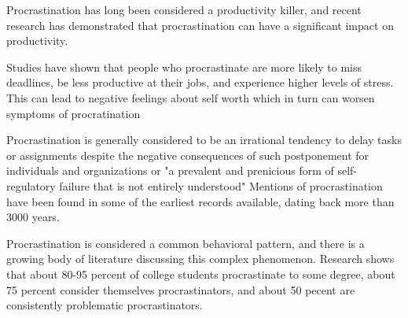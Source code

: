 

Procrastination has long been considered a productivity killer,
and recent research has demonstrated that procrastination can have a significant impact on productivity.  %

Studies have shown that people who procrastinate are more likely to miss deadlines, be less productive at their jobs, and experience higher levels of stress. This can lead to negative feelings about self worth which in turn can worsen symptoms of procratination %



Procrastination is generally considered to be an irrational
tendency to delay tasks or assignments despite the negative
consequences of such postponement for individuals and organizations\cite{hen2018causes}  \cite{lay1986last} or "a prevalent and prenicious form of self-regulatory failure that is not entirely understood"
Mentions of procrastination have been found in some of the earliest records available, dating back more than 3000 years. \cite{Piers2007}



Procrastination is considered a common behavioral pattern,
and there is a growing body of literature discussing this complex phenomenon.\cite{Yan2022}
Research shows that about 80-95 percent of college students procrastinate to some degree, about 75
percent consider themselves  procrastinators, and about 50 pecent are consistently problematic procrastinators. \cite{Steel2007}

